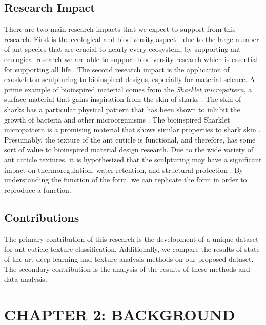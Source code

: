 \documentclass[12pt]{article}
\begin{document}
\subsection{Research Impact}

There are two main research impacts that we expect to support from this
research. First is the ecological and biodiversity aspect - due to the large
number of ant species that are crucial to nearly every ecosystem, by supporting
ant ecological research we are able to support biodiversity research which is
essential for supporting all life \cite{pongsiri_examining_2007}. The second
research impact is the application of exoskeleton sculpturing to bioinspired
designs, especially for material science. A prime example of bioinspired
material comes from the \textit{Sharklet micropattern}, a surface material that
gains inspiration from the skin of sharks \cite{cooper_engineered_2011}. The
skin of sharks has a particular physical pattern that has been shown to inhibit
the growth of bacteria and other microorganisms \cite{cooper_engineered_2011}.
The bioinspired Sharklet micropattern is a promising material that shows similar
properties to shark skin \cite{mann_surface_2014}. Presumably, the texture of
the ant cuticle is functional, and therefore, has some sort of value to
bioinspired material design research. Due to the wide variety of ant cuticle
textures, it is hypothesized that the sculpturing may have a significant impact
on thermoregulation, water retention, and structural protection
\cite{james_cross_2021}. By understanding the function of the form, we can
replicate the form in order to reproduce a function.

\subsection{Contributions}

The primary contribution of this research is the development of a unique dataset
for ant cuticle texture classification. Additionally, we compare the results of
state-of-the-art deep learning and texture analysis methods on our proposed
dataset. The secondary contribution is the analysis of the results of these
methods and data analysis.
\FloatBarrier
\newpage

\section{CHAPTER 2: BACKGROUND}
\end{document}
